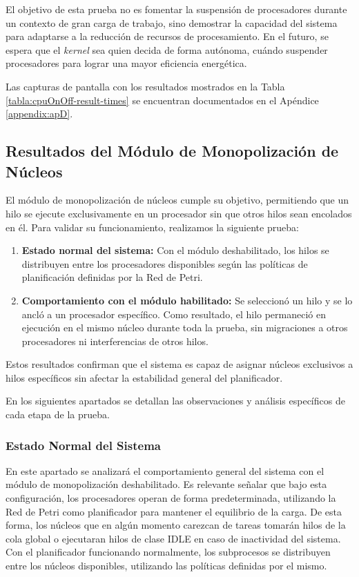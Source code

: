 El objetivo de esta prueba no es fomentar la suspensión de procesadores durante un contexto de gran carga de trabajo, sino demostrar la capacidad del sistema para adaptarse a la reducción de recursos de procesamiento. En el futuro, se espera que el \textit{kernel} sea quien decida de forma autónoma, cuándo suspender procesadores para lograr una mayor eficiencia energética.\par

Las capturas de pantalla con los resultados mostrados en la Tabla \ref{tabla:cpuOnOff-result-times} se encuentran documentados en el Apéndice \ref{appendix:apD}.


\subsection{Resultados del Módulo de Monopolización de Núcleos}

El módulo de monopolización de núcleos cumple su objetivo, permitiendo que un hilo se ejecute exclusivamente en un procesador sin que otros hilos sean encolados en él. Para validar su funcionamiento, realizamos la siguiente prueba:

\begin{enumerate}
    \item \textbf{Estado normal del sistema:} Con el módulo deshabilitado, los hilos se distribuyen entre los procesadores disponibles según las políticas de planificación definidas por la Red de Petri.
    \item \textbf{Comportamiento con el módulo habilitado:} Se seleccionó un hilo y se lo ancló a un procesador específico. Como resultado, el hilo permaneció en ejecución en el mismo núcleo durante toda la prueba, sin migraciones a otros procesadores ni interferencias de otros hilos.
\end{enumerate}

Estos resultados confirman que el sistema es capaz de asignar núcleos exclusivos a hilos específicos sin afectar la estabilidad general del planificador.

En los siguientes apartados se detallan las observaciones y análisis específicos de cada etapa de la prueba.

\subsubsection{Estado Normal del Sistema}

En este apartado se analizará el comportamiento general del sistema con el módulo de monopolización deshabilitado. Es relevante señalar que bajo esta configuración, los procesadores operan de forma predeterminada, utilizando la Red de Petri como planificador para mantener el equilibrio de la carga. De esta forma, los núcleos que en algún momento carezcan de tareas tomarán hilos de la cola global o ejecutaran hilos de clase IDLE en caso de inactividad del sistema. Con el planificador funcionando normalmente, los subprocesos se distribuyen entre los núcleos disponibles, utilizando las políticas definidas por el mismo.\par

